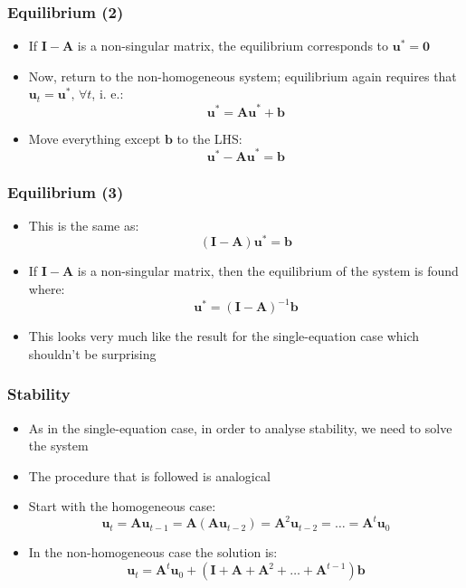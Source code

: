 \documentclass[10pt,usenames,dvipsnames]{beamer}
\theoremstyle{definition}
\begin{document}
\begin{frame}[fragile]
\frametitle{Equilibrium (2)}
\begin{itemize}
	\item If $\mathbf{I-A}$ is a non-singular matrix, the equilibrium corresponds to  $\mathbf{u}^{*} = \mathbf{0}$
	\item Now, return to the non-homogeneous system; equilibrium again requires that $\mathbf{u}_{t} = \mathbf{u}^{*},\, \forall t$, i. e.:
	\[
		\mathbf{u}^{*} = \mathbf{Au}^{*} + \mathbf{b}
	\]
	\item Move everything except $\mathbf{b}$ to the LHS:
	\[
		\mathbf{u}^{*} - \mathbf{Au}^{*} = \mathbf{b}
	\]
\end{itemize}
\end{frame}

\begin{frame}[fragile]
\frametitle{Equilibrium (3)}
\begin{itemize}
	\item This is the same as:
	\[
		(\mathbf{I-A})\mathbf{u}^{*} = \mathbf{b}
	\]
	\item If $\mathbf{I-A}$ is a non-singular matrix, then the equilibrium of the system is found where:
	\[
		\mathbf{u}^{*} = (\mathbf{I-A})^{-1}\mathbf{b}
	\]
	\item This looks very much like the result for the single-equation case which shouldn't be surprising
\end{itemize}
\end{frame}

\begin{frame}[fragile]
\frametitle{Stability}
\begin{itemize}
	\item As in the single-equation case, in order to analyse stability, we need to solve the system
	\item The procedure that is followed is analogical
	\item Start with the homogeneous case:
	\[
		\mathbf{u}_{t} = \mathbf{Au}_{t-1} = \mathbf{A}(\mathbf{Au}_{t-2}) = \mathbf{A}^{2}\mathbf{u}_{t-2} = \ldots = \mathbf{A}^{t}\mathbf{u}_{0}
	\]
	\item In the non-homogeneous case the solution is:
	\[
		\mathbf{u}_{t} = \mathbf{A}^{t}\mathbf{u}_{0} + (\mathbf{I + A} + \mathbf{A}^{2} + \ldots + \mathbf{A}^{t-1})\mathbf{b}
	\]
\end{itemize}
\end{frame}
\end{document}
